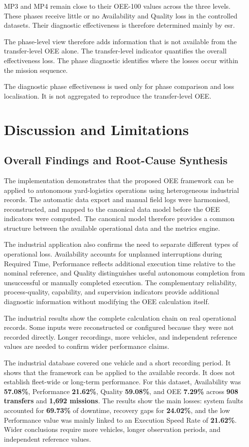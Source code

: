 MP3 and MP4 remain close to their OEE-100 values across the three levels. These phases receive little or no Availability and Quality loss in the controlled datasets. Their diagnostic effectiveness is therefore determined mainly by \acrshort{esr}.



The phase-level view therefore adds information that is not available from the
transfer-level OEE alone. The transfer-level indicator quantifies the overall
effectiveness loss. The phase diagnostic identifies where the losses occur
within the mission sequence.

The diagnostic phase effectiveness is used only for phase comparison and loss
localisation. It is not aggregated to reproduce the transfer-level OEE.
\section{Discussion and Limitations}
\subsection{Overall Findings and Root-Cause Synthesis}
The implementation demonstrates that the proposed OEE framework can be applied to autonomous yard-logistics operations using heterogeneous industrial records. The automatic data export and manual field logs were harmonised, reconstructed, and mapped to the canonical data model before the OEE indicators were computed. The canonical model therefore provides a common structure between the available operational data and the metrics engine.

The industrial application also confirms the need to separate different types of operational loss. Availability accounts for unplanned interruptions during Required Time, Performance reflects additional execution time relative to the nominal reference, and Quality distinguishes useful autonomous completion from unsuccessful or manually completed execution. The complementary reliability, process-quality, capability, and supervision indicators provide additional diagnostic information without modifying the OEE calculation itself.

The industrial results show the complete calculation chain on real operational records. Some inputs were reconstructed or configured because they were not recorded directly. Longer recordings, more vehicles, and independent reference values are needed to confirm wider performance claims.

The industrial database covered one vehicle and a short recording period. It shows that the framework can be applied to the available records. It does not establish fleet-wide or long-term performance. For this dataset, Availability was \textbf{57.08\%}, Performance \textbf{21.62\%}, Quality \textbf{59.08\%}, and OEE \textbf{7.29\%} across \textbf{908 transfers} and \textbf{1,692 missions}. The results show the main losses: system faults accounted for \textbf{69.73\%} of downtime, recovery gaps for \textbf{24.02\%}, and the low Performance value was mainly linked to an Execution Speed Rate of \textbf{21.62\%}. Wider conclusions require more vehicles, longer observation periods, and independent reference values.

